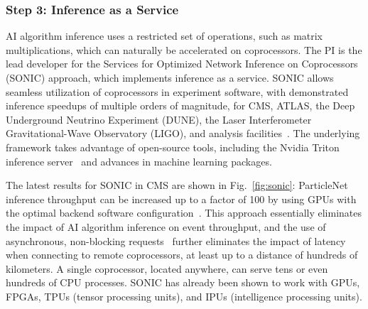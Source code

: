 \subsubsection{Step 3: Inference as a Service}\label{subsec:iaas}

AI algorithm inference uses a restricted set of operations, such as matrix multiplications, which can naturally be accelerated on coprocessors.
The PI is the lead developer for the Services for Optimized Network Inference on Coprocessors (SONIC) approach, which implements inference as a service.
SONIC allows seamless utilization of coprocessors in experiment software, with demonstrated inference speedups of multiple orders of magnitude,
for CMS, ATLAS, the Deep Underground Neutrino Experiment (DUNE), the Laser Interferometer Gravitational-Wave Observatory (LIGO), and analysis facilities~\cite{Duarte:2019fta,Krupa:2020bwg,Wang:2020fjr,Rankin:2020usv,Gunny:2021gne,Cai:2023ldc,CMS:2024twn,Savard:2023wwi}.
The underlying framework takes advantage of open-source tools, including the Nvidia Triton inference server~\cite{nvidia} and advances in machine learning packages.

The latest results for SONIC in CMS are shown in Fig.~\ref{fig:sonic}:
ParticleNet inference throughput can be increased up to a factor of 100 by using GPUs with the optimal backend software configuration~\cite{CMS:2024twn}.
This approach essentially eliminates the impact of AI algorithm inference on event throughput,
and the use of asynchronous, non-blocking requests~\cite{Bocci:2020olh} further eliminates the impact of latency when connecting to remote coprocessors,
at least up to a distance of hundreds of kilometers.
A single coprocessor, located anywhere, can serve tens or even hundreds of CPU processes.
SONIC has already been shown to work with GPUs, FPGAs, TPUs (tensor processing units), and IPUs (intelligence processing units).

